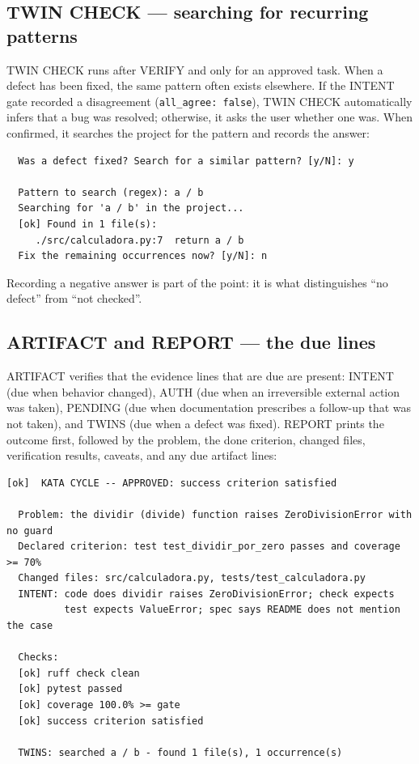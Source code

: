 \documentclass[11pt]{article}
\begin{document}
\subsection{TWIN CHECK --- searching for recurring patterns}

TWIN CHECK runs after VERIFY and only for an approved task. When a defect
has been fixed, the same pattern often exists elsewhere. If the INTENT gate
recorded a disagreement (\texttt{all\_agree: false}), TWIN CHECK
automatically infers that a bug was resolved; otherwise, it asks the user
whether one was. When confirmed, it searches the project for the pattern
and records the answer:

\begin{lstlisting}
  Was a defect fixed? Search for a similar pattern? [y/N]: y

  Pattern to search (regex): a / b
  Searching for 'a / b' in the project...
  [ok] Found in 1 file(s):
     ./src/calculadora.py:7  return a / b
  Fix the remaining occurrences now? [y/N]: n
\end{lstlisting}

Recording a negative answer is part of the point: it is what distinguishes
``no defect'' from ``not checked''.

\subsection{ARTIFACT and REPORT --- the due lines}

ARTIFACT verifies that the evidence lines that are due are present: INTENT
(due when behavior changed), AUTH (due when an irreversible external action
was taken), PENDING (due when documentation prescribes a follow-up that was
not taken), and TWINS (due when a defect was fixed). REPORT prints the
outcome first, followed by the problem, the done criterion, changed files,
verification results, caveats, and any due artifact lines:

\begin{lstlisting}
[ok]  KATA CYCLE -- APPROVED: success criterion satisfied

  Problem: the dividir (divide) function raises ZeroDivisionError with no guard
  Declared criterion: test test_dividir_por_zero passes and coverage >= 70%
  Changed files: src/calculadora.py, tests/test_calculadora.py
  INTENT: code does dividir raises ZeroDivisionError; check expects
          test expects ValueError; spec says README does not mention the case

  Checks:
  [ok] ruff check clean
  [ok] pytest passed
  [ok] coverage 100.0% >= gate
  [ok] success criterion satisfied

  TWINS: searched a / b - found 1 file(s), 1 occurrence(s)
\end{lstlisting}
\end{document}
